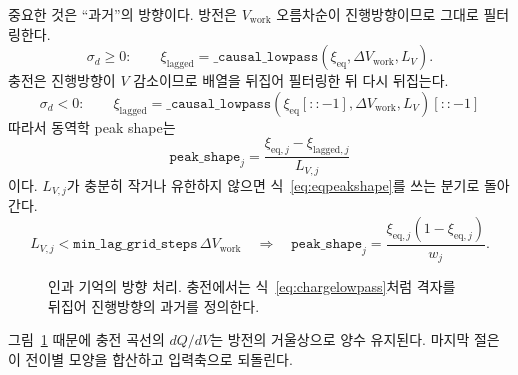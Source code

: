 \documentclass[11pt,a4paper]{article}
\newcommand{\eq}{\mathrm{eq}}
\newcommand{\work}{\mathrm{work}}
\newcommand{\lag}{\mathrm{lagged}}
\begin{document}
중요한 것은 ``과거''의 방향이다. 방전은 $V_{\work}$ 오름차순이 진행방향이므로 그대로 필터링한다.
\begin{equation}
\sigma_d\ge0:\qquad
\xi_{\lag}=\texttt{\_causal\_lowpass}(\xi_{\eq},\Delta V_{\work},L_V).
\label{eq:dislowpass}
\end{equation}
충전은 진행방향이 $V$ 감소이므로 배열을 뒤집어 필터링한 뒤 다시 뒤집는다.
\begin{equation}
\boxed{\;\sigma_d<0:\qquad
\xi_{\lag}=
\texttt{\_causal\_lowpass}(\xi_{\eq}[::-1],\Delta V_{\work},L_V)[::-1]\;}
\label{eq:chargelowpass}
\end{equation}
따라서 동역학 peak shape는
\begin{equation}
\boxed{\;\texttt{peak\_shape}_j
=\frac{\xi_{\eq,j}-\xi_{\lag,j}}{L_{V,j}}\;}
\label{eq:tailpeak}
\end{equation}
이다. $L_{V,j}$가 충분히 작거나 유한하지 않으면 식~\eqref{eq:eqpeakshape}를 쓰는 분기로 돌아간다.
\begin{equation}
L_{V,j}<\texttt{min\_lag\_grid\_steps}\,\Delta V_{\work}
\quad\Longrightarrow\quad
\texttt{peak\_shape}_j=\frac{\xi_{\eq,j}(1-\xi_{\eq,j})}{w_j}.
\label{eq:minlagbranch}
\end{equation}

\begin{figure}[t]
\centering
{}
\caption{인과 기억의 방향 처리. 충전에서는 식~\eqref{eq:chargelowpass}처럼 격자를 뒤집어 진행방향의 과거를 정의한다.}
\label{fig:causaltail}
\end{figure}

그림~\ref{fig:causaltail} 때문에 충전 곡선의 $dQ/dV$는 방전의 거울상으로 양수 유지된다. 마지막 절은 이 전이별 모양을 합산하고 입력축으로 되돌린다.
\end{document}
